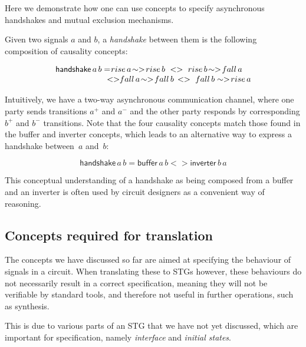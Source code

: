 \documentclass[british,conference,compsoc]{IEEEtran}
\begin{document}
Here we demonstrate how one can use concepts to specify asynchronous handshakes
and mutual exclusion mechanisms.

Given two signals $a$ and $b$, a \emph{handshake} between them is
the following composition of causality concepts:

\[
\begin{array}{lcl}
\mathsf{handshake}\,a\, b=&\hspace{-7mm}rise\,a\!\sim>\! rise\,b\ 
	<>\ rise\,b\!\sim>\! fall\,a \\
&\hspace{-5mm}<>\hspace{-1mm} fall\,a\!\sim>\! fall\,b \, 
	<>\ fall\,b \sim>\! rise\,a
\end{array}
\]

Intuitively, we have a two-way asynchronous communication channel,
where one party sends transitions $a^{+}$ and $a^{-}$ and the other
party responds by corresponding $b^{+}$ and $b^{-}$ transitions.
Note that the four causality concepts match those found
in the buffer and inverter concepts, which leads to an alternative
way to express a handshake between~$a$ and~$b$:

\vspace{-3mm}

\[
\mathsf{handshake}\,a\, b=\mathsf{buffer}\,a\, b <>\mathsf{inverter}\,b\, a
\]

\vspace{-1mm}

This conceptual understanding of a handshake as being composed
from a buffer and an inverter is often used by circuit designers as
a convenient way of reasoning.

\vspace{-2mm}

\subsection{Concepts required for translation\label{sub:trans-concepts}}

\vspace{-2mm}

The concepts we have discussed so far are aimed at specifying the behaviour of 
signals in a circuit. When translating these to STGs however, these behaviours 
do not necessarily result in a correct specification, meaning they will not be 
verifiable by standard tools, and therefore not useful in further operations, 
such as synthesis.

This is due to various parts of an STG that we have not yet discussed, which 
are important for specification, namely \emph{interface} and 
\emph{initial states}.
\end{document}
